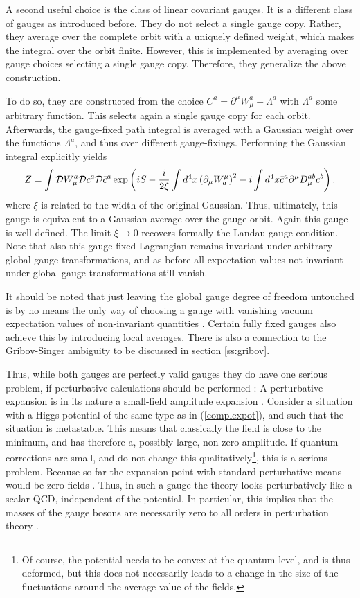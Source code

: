 \documentclass[final,12pt,3p,longtitle]{elsarticle}
\newcommand*{\no}{\noindent}
\newcommand*{\be}{\begin{equation}}
\newcommand*{\ee}{\end{equation}}
\newcommand*{\pd}{\partial}
\newcommand*{\pdm}{\pd_{\mu}}
\newcommand*{\pref}[1]{(\ref{#1})}
\newcommand*{\nn}{\nonumber}
\newcommand*{\1}{1\!\!\!\bot}
\begin{document}
A second useful choice is the class of linear covariant gauges. It is a different class of gauges as introduced before. They do not select a single gauge copy. Rather, they average over the complete orbit with a uniquely defined weight, which makes the integral over the orbit finite. However, this is implemented by averaging over gauge choices selecting a single gauge copy. Therefore, they generalize the above construction.

To do so, they are constructed from the choice $C^a=\pd^\mu W_\mu^a+\Lambda^a$ with $\Lambda^a$ some arbitrary function. This selects again a single gauge copy for each orbit. Afterwards, the gauge-fixed path integral is averaged with a Gaussian weight over the functions $\Lambda^a$, and thus over different gauge-fixings. Performing the Gaussian integral explicitly yields \cite{Bohm:2001yx}
\be
Z=\int{\cal D}W_\mu^a{\cal D}c^a{\cal D}{\bar c}^a\exp\left(iS-\frac{i}{2\xi}\int d^4 x\left(\pdm W^\mu_a\right)^2-i\int d^4x \bar{c}^a\pd^\mu D_\mu^{ab} c^b\right)\nn.
\ee
\no where $\xi$ is related to the width of the original Gaussian. Thus, ultimately, this gauge is equivalent to a Gaussian average over the gauge orbit. Again this gauge is well-defined. The limit $\xi\to 0$ recovers formally the Landau gauge condition. Note that also this gauge-fixed Lagrangian remains invariant under arbitrary global gauge transformations, and as before all expectation values not invariant under global gauge transformations still vanish.

It should be noted that just leaving the global gauge degree of freedom untouched is by no means the only way of choosing a gauge with vanishing vacuum expectation values of non-invariant quantities \cite{Strocchi:1985cf}. Certain fully fixed gauges also achieve this by introducing local averages. There is also a connection to the Gribov-Singer ambiguity to be discussed in section \ref{ss:gribov}.

Thus, while both gauges are perfectly valid gauges they do have one serious problem, if perturbative calculations should be performed \cite{Lee:1974zg}: A perturbative expansion is in its nature a small-field amplitude expansion \cite{Rivers:1987hi}. Consider a situation with a Higgs potential of the same type as in \pref{complexpot}, and such that the situation is metastable. This means that classically the field is close to the minimum, and has therefore a, possibly large, non-zero amplitude. If quantum corrections are small, and do not change this qualitatively\footnote{Of course, the potential needs to be convex at the quantum level, and is thus deformed, but this does not necessarily leads to a change in the size of the fluctuations around the average value of the fields.}, this is a serious problem. Because so far the expansion point with standard perturbative means would be zero fields \cite{Bohm:2001yx}. Thus, in such a gauge the theory looks perturbatively like a scalar QCD, independent of the potential. In particular, this implies that the masses of the gauge bosons are necessarily zero to all orders in perturbation theory \cite{Bohm:2001yx}.
\end{document}
